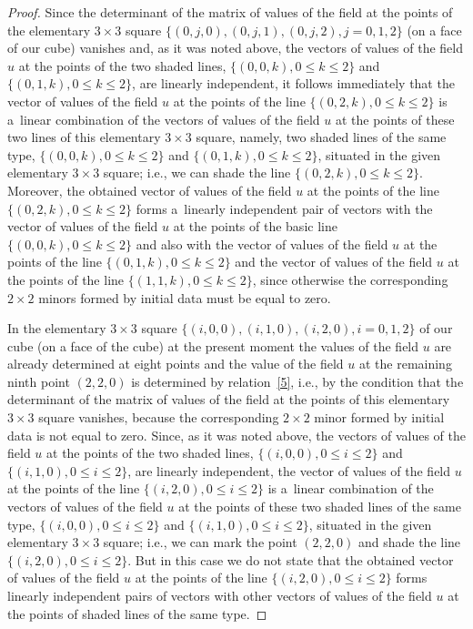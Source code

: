 \begin{proof}
Since the determinant of the matrix of values of the f\/ield at the
points of the elementary $3 \times 3$ square $\{(0, j, 0), (0, j,
1), (0, j, 2), j = 0, 1, 2\}$ (on a face of our cube) vanishes and,
as it was noted above, the vectors of values of the f\/ield $u$ at the
points of the two shaded lines, $\{(0, 0, k), 0 \leq k \leq 2\}$ and
$\{(0, 1, k), 0 \leq k \leq 2\}$, are linearly independent, it
follows immediately that the vector of values of the f\/ield $u$ at
the points of the line $\{(0, 2, k), 0 \leq k \leq 2\}$ is a~linear
combination of the vectors of values of the f\/ield $u$ at the points
of these two lines of this elementary $3 \times 3$ square, namely,
two shaded lines of the same type, $\{(0, 0, k), 0 \leq k \leq 2\}$
and $\{(0, 1, k), 0 \leq k \leq 2\}$, situated in the given
elementary $3 \times 3$ square; i.e., we can shade the line $\{(0,
2, k), 0 \leq k \leq 2\}$. Moreover, the obtained vector of values
of the f\/ield $u$ at the points of the line $\{(0, 2, k), 0 \leq k
\leq 2\}$ forms a~linearly independent pair of vectors with the
vector of values of the f\/ield $u$ at the points of the basic line
$\{(0, 0, k), 0 \leq k \leq 2\}$ and also with the vector of values
of the f\/ield $u$ at the points of the line $\{(0, 1, k), 0 \leq k
\leq 2\}$ and the vector of values of the f\/ield $u$ at the points of
the line $\{(1, 1, k), 0 \leq k \leq 2\}$, since otherwise the
corresponding $2 \times 2$ minors formed by initial data must be
equal to zero.



In the elementary $3 \times 3$ square $\{(i, 0, 0), (i, 1, 0), (i,
2, 0), i = 0, 1, 2\}$ of our cube (on a face of the cube) at the
present moment the values of the f\/ield $u$ are already determined at
eight points and the value of the f\/ield $u$ at the remaining ninth
point $(2, 2, 0)$ is determined by relation~\eqref{5}, i.e.,
by the condition that the determinant of the matrix of values of the
f\/ield at the points of this elementary $3 \times 3$ square vanishes,
because the corresponding $2 \times 2$ minor formed by initial data
is not equal to zero. Since, as it was noted above, the vectors of
values of the f\/ield $u$ at the points of the two shaded lines,
$\{(i, 0, 0), 0 \leq i \leq 2\}$ and $\{(i, 1, 0), 0 \leq i \leq
2\}$, are linearly independent, the vector of values of the f\/ield
$u$ at the points of the line $\{(i, 2, 0), 0 \leq i \leq 2\}$ is a~linear combination of the vectors of values of the f\/ield $u$ at the
points of these two shaded lines of the same type, $\{(i, 0, 0), 0
\leq i \leq 2\}$ and $\{(i, 1, 0), 0 \leq i \leq 2\}$, situated in
the given elementary $3 \times 3$ square; i.e., we can mark the
point $(2, 2, 0)$ and shade the line $\{(i, 2, 0), 0 \leq i \leq
2\}$. But in this case we do not state that the obtained vector of
values of the f\/ield $u$ at the points of the line $\{(i, 2, 0), 0
\leq i \leq 2\}$ forms linearly independent pairs of vectors with
other vectors of values of the f\/ield $u$ at the points of shaded
lines of the same type.





\end{proof}
